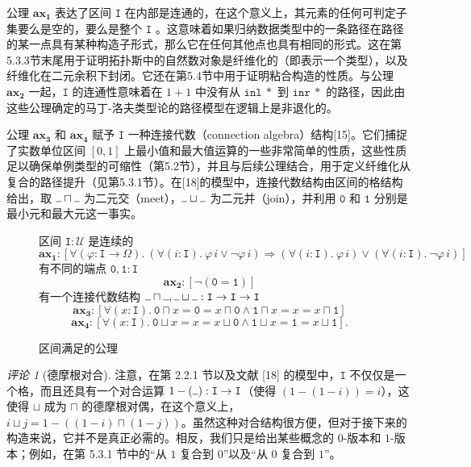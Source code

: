\documentclass{ctexrep}
\theoremstyle{plain}
\theoremstyle{definition}
\theoremstyle{remark}
\newtheorem{remark}[theorem]{评论}
\newcommand\ttI{\mathtt{I}}
\newcommand{\ttzero}{\mathtt{0}}
\newcommand{\ttone}{\mathtt{1}}
\newcommand{\ax}[1]{\mathbf{ax_{#1}}}
\newcommand{\ul}{{\rule[0ex]{0.5em}{0.4pt}}} %
\begin{document}
公理 $\ax{1}$ 表达了区间 $\ttI$ 在内部是连通的，在这个意义上，其元素的任何可判定子集要么是空的，要么是整个 $\ttI$ 。这意味着如果归纳数据类型中的一条路径在路径的某一点具有某种构造子形式，那么它在任何其他点也具有相同的形式。这在第5.3.3节末尾用于证明拓扑斯中的自然数对象是纤维化的（即表示一个类型），以及纤维化在二元余积下封闭。它还在第5.4节中用于证明粘合构造的性质。与公理 $\ax{2}$ 一起，$\ttI$ 的连通性意味着在 $1+1$  中没有从 $\mathtt{inl}\ \ast$ 到 $\mathtt{inr}\ \ast$ 的路径，因此由这些公理确定的马丁-洛夫类型论的路径模型在逻辑上是非退化的。

公理 $\ax{3}$ 和 $\ax{4}$ 赋予 $\ttI$ 一种连接代数（connection algebra）结构[15]。它们捕捉了实数单位区间 $[0,1]$ 上最小值和最大值运算的一些非常简单的性质，这些性质足以确保单例类型的可缩性（第5.2节），并且与后续公理结合，用于定义纤维化从复合的路径提升（见第5.3.1节）。在[18]的模型中，连接代数结构由区间的格结构给出，取 $\ul \sqcap\ul $ 为二元交（meet），$\ul \sqcup\ul $ 为二元并（join），并利用 $\ttzero$ 和 $\ttone$ 分别是最小元和最大元这一事实。

\begin{figure}[htbp]
\centering

区间 $\mathtt{I} : \mathcal{U}$ 是连续的
\[
\ax{1} : [\forall (\varphi : \mathtt{I} \to \Omega).\ 
(\forall (i : \mathtt{I}).\ \varphi\,i \lor \neg\varphi\,i) \Rightarrow 
(\forall (i : \mathtt{I}).\ \varphi\,i) \lor (\forall (i : \mathtt{I}).\ 
\neg\varphi\,i)]
\]
有不同的端点 $\ttzero, \ttone : \mathtt{I}$
\[
\ax{2} : [\neg(\ttzero = \ttone)]
\]
有一个连接代数结构
$\ul \sqcap\ul , \ul \sqcup\ul  : \mathtt{I} \to \mathtt{I} \to \mathtt{I}$
\[
\ax{3} : [\forall (x : \mathtt{I}).\ \ttzero \sqcap x = \ttzero = x \sqcap \ttzero \land 
\ttone \sqcap x = x = x \sqcap \ttone]
\]
\[
\ax{4} : [\forall (x : \mathtt{I}).\ \ttzero \sqcup x = x = x \sqcup \ttzero \land 
\ttone \sqcup x = \ttone = x \sqcup \ttone].
\]

\caption{区间满足的公理}
\label{fig:interval-axioms}

\end{figure}

\begin{remark}[德摩根对合]
注意，在第 2.2.1 节以及文献 [18] 的模型中，$\mathtt{I}$ 不仅仅是一个格，而且还具有一个对合运算 $1 - (\ul ) : \mathtt{I} \to \mathtt{I}$（使得 $(1 - (1 - i)) = i$），这使得 
$\sqcup$ 成为 $\sqcap$ 的德摩根对偶，在这个意义上，$i \sqcup j = 1 - ((1 - i) \sqcap (1 - j))$。虽然这种对合结构很方便，但对于接下来的构造来说，它并不是真正必需的。相反，我们只是给出某些概念的 $0$-版本和 $1$-版本；例如，在第 5.3.1 节中的``从 $1$ 复合到 $0$''以及``从 $0$ 复合到 $1$''。
\end{remark}
\end{document}
